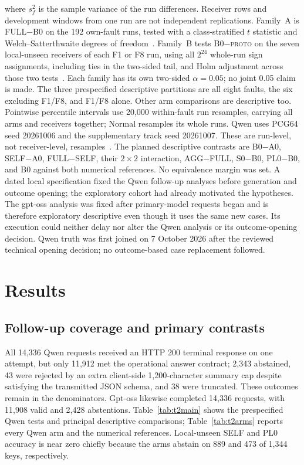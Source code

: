 \documentclass[conference]{IEEEtran}
\newcommand{\PROTO}{\textsc{proto}}
\newcommand{\cond}[1]{\textsf{#1}}
\begin{document}
where $s_f^2$ is the sample variance of the run differences. Receiver rows and development windows from one run are not independent replications. Family~A is \cond{FULL}$-$\cond{B0} on the 192 own-fault runs, tested with a class-stratified $t$ statistic and Welch--Satterthwaite degrees of freedom~\cite{welch1947,satterthwaite1946}. Family~B tests \cond{B0}$-$\PROTO{} on the seven local-unseen receivers of each F1 or F8 run, using all $2^{24}$ whole-run sign assignments, including ties in the two-sided tail, and Holm adjustment across those two tests~\cite{holm1979}. Each family has its own two-sided $\alpha=0.05$; no joint 0.05 claim is made. The three prespecified descriptive partitions are all eight faults, the six excluding F1/F8, and F1/F8 alone. Other arm comparisons are descriptive too. Pointwise percentile intervals use 20,000 within-fault run resamples, carrying all arms and receivers together; Normal resamples its whole runs. Qwen uses PCG64 seed 20261006 and the supplementary track seed 20261007. These are run-level, not receiver-level, resamples~\cite{field2007bootstrap}. The planned descriptive contrasts are \cond{B0}$-$\cond{A0}, \cond{SELF}$-$\cond{A0}, \cond{FULL}$-$\cond{SELF}, their $2\times2$ interaction, \cond{AGG}$-$\cond{FULL}, \cond{S0}$-$\cond{B0}, \cond{PL0}$-$\cond{B0}, and \cond{B0} against both numerical references. No equivalence margin was set. A dated local specification fixed the Qwen follow-up analyses before generation and outcome opening; the exploratory cohort had already motivated the hypotheses. The gpt-oss analysis was fixed after primary-model requests began and is therefore exploratory descriptive even though it uses the same new cases. Its execution could neither delay nor alter the Qwen analysis or its outcome-opening decision. Qwen truth was first joined on 7 October 2026 after the reviewed technical opening decision; no outcome-based case replacement followed.


\section{Results}
\label{sec:results}
\subsection{Follow-up coverage and primary contrasts}
All 14,336 Qwen requests received an HTTP 200 terminal response on one attempt, but only 11,912 met the operational answer contract; 2,343 abstained, 43 were rejected by an extra client-side 1,200-character summary cap despite satisfying the transmitted JSON schema, and 38 were truncated. These outcomes remain in the denominators. Gpt-oss likewise completed 14,336 requests, with 11,908 valid and 2,428 abstentions. Table~\ref{tab:t2main} shows the prespecified Qwen tests and principal descriptive comparisons; Table~\ref{tab:t2arms} reports every Qwen arm and the numerical references. Local-unseen \cond{SELF} and \cond{PL0} accuracy is near zero chiefly because the arms abstain on 889 and 473 of 1,344 keys, respectively.
\end{document}
